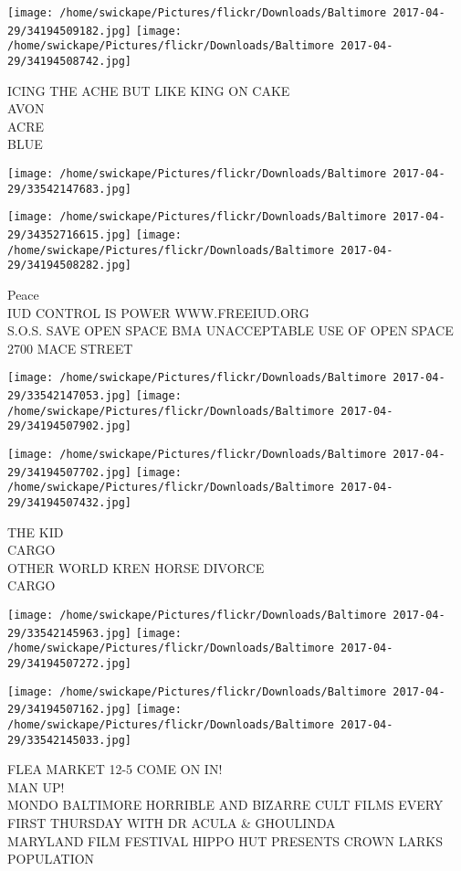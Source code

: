 \documentclass[10pt,letterpaper]{article}
\begin{document}
\texttt{[image: /home/swickape/Pictures/flickr/Downloads/Baltimore 2017-04-29/34194509182.jpg]}
\texttt{[image: /home/swickape/Pictures/flickr/Downloads/Baltimore 2017-04-29/34194508742.jpg]}

ICING THE ACHE BUT LIKE KING ON CAKE\\
AVON\\
ACRE\\
BLUE
\pagebreak

\texttt{[image: /home/swickape/Pictures/flickr/Downloads/Baltimore 2017-04-29/33542147683.jpg]}

\vspace{0.25in}
\texttt{[image: /home/swickape/Pictures/flickr/Downloads/Baltimore 2017-04-29/34352716615.jpg]}
\texttt{[image: /home/swickape/Pictures/flickr/Downloads/Baltimore 2017-04-29/34194508282.jpg]}

Peace\\
IUD CONTROL IS POWER WWW.FREEIUD.ORG\\
S.O.S. SAVE OPEN SPACE BMA UNACCEPTABLE USE OF OPEN SPACE 2700 MACE STREET
\pagebreak

\texttt{[image: /home/swickape/Pictures/flickr/Downloads/Baltimore 2017-04-29/33542147053.jpg]}
\texttt{[image: /home/swickape/Pictures/flickr/Downloads/Baltimore 2017-04-29/34194507902.jpg]}

\texttt{[image: /home/swickape/Pictures/flickr/Downloads/Baltimore 2017-04-29/34194507702.jpg]}
\texttt{[image: /home/swickape/Pictures/flickr/Downloads/Baltimore 2017-04-29/34194507432.jpg]}

THE KID\\
CARGO\\
OTHER WORLD KREN HORSE DIVORCE\\
CARGO
\pagebreak

\texttt{[image: /home/swickape/Pictures/flickr/Downloads/Baltimore 2017-04-29/33542145963.jpg]}
\texttt{[image: /home/swickape/Pictures/flickr/Downloads/Baltimore 2017-04-29/34194507272.jpg]}

\texttt{[image: /home/swickape/Pictures/flickr/Downloads/Baltimore 2017-04-29/34194507162.jpg]}
\texttt{[image: /home/swickape/Pictures/flickr/Downloads/Baltimore 2017-04-29/33542145033.jpg]}

FLEA MARKET 12{-}5 COME ON IN!\\
MAN UP!\\
MONDO BALTIMORE HORRIBLE AND BIZARRE CULT FILMS EVERY FIRST THURSDAY WITH DR ACULA \& GHOULINDA\\
MARYLAND FILM FESTIVAL HIPPO HUT PRESENTS CROWN LARKS POPULATION
\pagebreak
\end{document}
